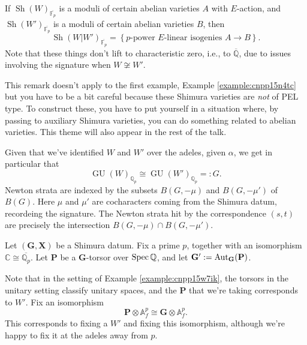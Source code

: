 \documentclass[reqno]{amsart} 
\begin{document}
\begin{remark}
  If $\operatorname{Sh}(W)_{\overline{\mathbb{F}_p}}$ is a moduli of certain abelian varieties $A$ with $E$-action, and $\operatorname{Sh}(W')_{\overline{\mathbb{F}_p}}$ is a moduli of certain abelian varieties $B$, then
  \begin{equation*}
    \operatorname{Sh}(W | W')_{\overline{\mathbb{F}_p}} = \left\{ \text{$p$-power $E$-linear isogenies } A \rightarrow B \right\}.
  \end{equation*}
  Note that these things don't lift to characteristic zero, i.e., to $\overline{\mathbb{Q}}$, due to issues involving the signature when $W \not \cong W'$.
\end{remark}
This remark doesn't apply to the first example, Example \ref{example:cnpp15n4tc} but you have to be a bit careful because these Shimura varieties are \emph{not} of PEL type.  To construct these, you have to put yourself in a situation where, by passing to auxiliary Shimura varieties, you can do something related to abelian varieties.  This theme will also appear in the rest of the talk.

Given that we've identified $W$ and $W'$ over the adeles, given $\alpha$, we get in particular that
\begin{equation*}
  \operatorname{GU}(W)_{\mathbb{Q}_p}
  \cong 
  \operatorname{GU}(W')_{\mathbb{Q}_p} =: G.
\end{equation*}
Newton strata are indexed by the subsets $B(G, - \mu)$ and $B(G, - \mu ')$ of $B(G)$.  Here $\mu$ and $\mu '$ are cocharacters coming from the Shimura datum, recordeing the signature.  The Newton strata hit by the correspondence $(s,t)$ are precisely the intersection $B(G, - \mu ) \cap B(G, - \mu ')$.

Let $(\mathbf{G}, \mathbf{X})$ be a Shimura datum.  Fix a prime $p$, together with an isomorphism $\mathbb{C} \cong \overline{\mathbb{Q}_p}$.  Let $\mathbf{P}$ be a $\mathbf{G}$-torsor over $\operatorname{Spec} \mathbb{Q}$, and let $\mathbf{G} ' := \operatorname{Aut}_{\mathbf{G}}(\mathbf{P})$.

Note that in the setting of Example \ref{example:cnpp15w7ik}, the torsors in the unitary setting classify unitary spaces, and the $\mathbf{P}$ that we're taking corresponds to $W'$.  Fix an isomorphism
\begin{equation*}
  \mathbf{P} \otimes \mathbb{A}_f^p \cong \mathbf{G} \otimes \mathbb{A}_f^p.
\end{equation*}
This corresponds to fixing a $W'$ and fixing this isomorphism, although we're happy to fix it at the adeles away from $p$.
\end{document}
